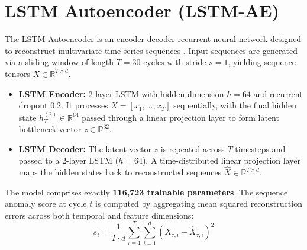 \documentclass[12pt,a4paper,oneside]{report}
\begin{document}
\section{LSTM Autoencoder (LSTM-AE)}
The LSTM Autoencoder is an encoder-decoder recurrent neural network designed to reconstruct multivariate time-series sequences \cite{malhotra2016lstm}. Input sequences are generated via a sliding window of length $T = 30$ cycles with stride $s = 1$, yielding sequence tensors $X \in \mathbb{R}^{T \times d}$.

\begin{itemize}
    \item \textbf{LSTM Encoder:} 2-layer LSTM with hidden dimension $h = 64$ and recurrent dropout $0.2$. It processes $X = [x_1, \dots, x_T]$ sequentially, with the final hidden state $h_T^{(2)} \in \mathbb{R}^{64}$ passed through a linear projection layer to form latent bottleneck vector $z \in \mathbb{R}^{32}$.
    \item \textbf{LSTM Decoder:} The latent vector $z$ is repeated across $T$ timesteps and passed to a 2-layer LSTM ($h = 64$). A time-distributed linear projection layer maps the hidden states back to reconstructed sequences $\hat{X} \in \mathbb{R}^{T \times d}$.
\end{itemize}
The model comprises exactly \textbf{116,723 trainable parameters}. The sequence anomaly score at cycle $t$ is computed by aggregating mean squared reconstruction errors across both temporal and feature dimensions:
\begin{equation}
    s_t = \frac{1}{T \cdot d} \sum_{\tau=1}^T \sum_{i=1}^d (X_{\tau, i} - \hat{X}_{\tau, i})^2
    \label{eq:lstm_score}
\end{equation}
\end{document}
